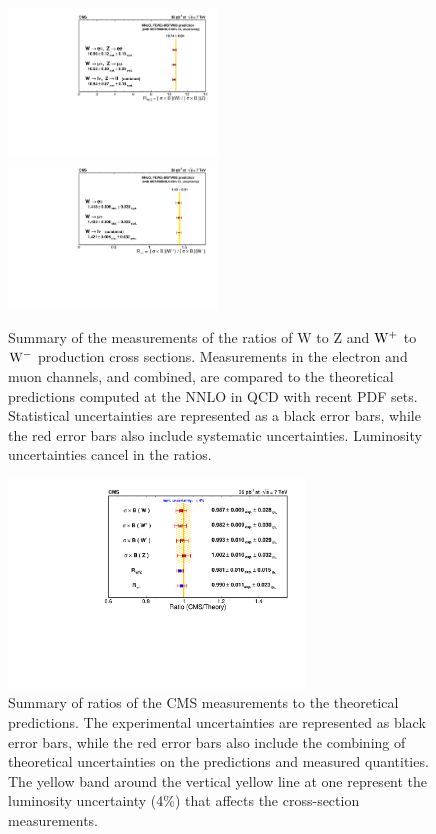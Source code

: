 \begin{figure}[htbp]
\begin{center}
  \includegraphics[width=0.495\textwidth]{figs/Results_R_WZ.pdf}
  \includegraphics[width=0.495\textwidth]{figs/Results_R_WpWm.pdf}
\caption[.]{\label{fig:R_LEPstylePlots}
Summary of the measurements of the ratios of W to Z and $\mathrm{W^+}$ to $\mathrm{W^-}$ production cross sections.
Measurements in the electron and muon channels, and combined, are compared to the
theoretical predictions computed at the NNLO in QCD with recent PDF sets.
Statistical uncertainties are represented as a black error bars, while the red error bars also include systematic uncertainties.
Luminosity uncertainties cancel in the ratios.
}
\end{center}
\end{figure}

\begin{figure}
\begin{center}
  \includegraphics[width=0.7\textwidth]{figs/Results_ratioTheory.pdf}
\caption[.]{\label{fig:RatioCMSTHY}
Summary of ratios of the CMS measurements to the theoretical predictions.
The experimental uncertainties are represented as black error bars, while the
red error bars also include the combining of theoretical uncertainties
on the predictions and measured quantities. The yellow band around the vertical yellow line at one
represent the luminosity uncertainty (4\%) that affects the cross-section measurements.
}
\end{center}
\end{figure}

